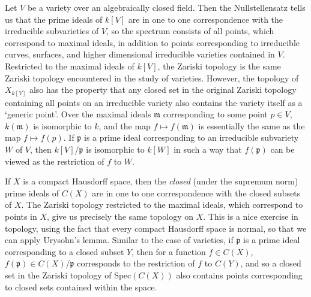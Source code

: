 \begin{example}
    Let $V$ be a variety over an algebraically closed field. Then the Nullstellensatz tells us that the prime ideals of $k[V]$ are in one to one correspondence with the irreducible subvarieties of $V$, so the spectrum consists of all points, which correspond to maximal ideals, in addition to points corresponding to irreducible curves, surfaces, and higher dimensional irreducible varieties contained in $V$. Restricted to the maximal ideals of $k[V]$, the Zariski topology is the same Zariski topology encountered in the study of varieties. However, the topology of $X_{k[V]}$ also has the property that any closed set in the original Zariski topology containing all points on an irreducible variety also contains the variety itself as a `generic point'. Over the maximal ideals $\mathfrak{m}$ corresponding to some point $p \in V$, $k(\mathfrak{m})$ is isomorphic to $k$, and the map $f \mapsto f(\mathfrak{m})$ is essentially the same as the map $f \mapsto f(p)$. If $\mathfrak{p}$ is a prime ideal corresponding to an irreducible subvariety $W$ of $V$, then $k[V]/\mathfrak{p}$ is isomorphic to $k[W]$ in such a way that $f(\mathfrak{p})$ can be viewed as the restriction of $f$ to $W$.
\end{example}

\begin{example}
    If $X$ is a compact Hausdorff space, then the {\it closed} (under the supremum norm) prime ideals of $C(X)$ are in one to one correspondence with the closed subsets of $X$. The Zariski topology restricted to the maximal ideals, which correspond to points in $X$, give us precisely the same topology on $X$. This is a nice exercise in topology, using the fact that every compact Hausdorff space is normal, so that we can apply Urysohn's lemma. Similar to the case of varieties, if $\mathfrak{p}$ is a prime ideal corresponding to a closed subset $Y$, then for a function $f \in C(X)$, $f(\mathfrak{p}) \in C(X)/\mathfrak{p}$ corresponds to the restriction of $f$ to $C(Y)$, and so a closed set in the Zariski topology of $\text{Spec}(C(X))$ also contains points corresponding to closed sets contained within the space.
\end{example}

